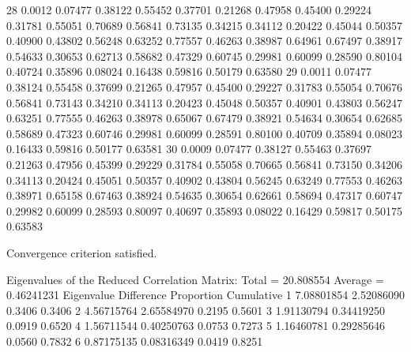 \documentclass{article}
\begin{document}
\begin{Woutput}
   28      0.0012  0.07477  0.38122  0.55452  0.37701  0.21268  0.47958  0.45400  0.29224  0.31781
                   0.55051  0.70689  0.56841  0.73135  0.34215  0.34112  0.20422  0.45044  0.50357
                   0.40900  0.43802  0.56248  0.63252  0.77557  0.46263  0.38987  0.64961  0.67497
                   0.38917  0.54633  0.30653  0.62713  0.58682  0.47329  0.60745  0.29981  0.60099
                   0.28590  0.80104  0.40724  0.35896  0.08024  0.16438  0.59816  0.50179  0.63580
   29      0.0011  0.07477  0.38124  0.55458  0.37699  0.21265  0.47957  0.45400  0.29227  0.31783
                   0.55054  0.70676  0.56841  0.73143  0.34210  0.34113  0.20423  0.45048  0.50357
                   0.40901  0.43803  0.56247  0.63251  0.77555  0.46263  0.38978  0.65067  0.67479
                   0.38921  0.54634  0.30654  0.62685  0.58689  0.47323  0.60746  0.29981  0.60099
                   0.28591  0.80100  0.40709  0.35894  0.08023  0.16433  0.59816  0.50177  0.63581
   30      0.0009  0.07477  0.38127  0.55463  0.37697  0.21263  0.47956  0.45399  0.29229  0.31784
                   0.55058  0.70665  0.56841  0.73150  0.34206  0.34113  0.20424  0.45051  0.50357
                   0.40902  0.43804  0.56245  0.63249  0.77553  0.46263  0.38971  0.65158  0.67463
                   0.38924  0.54635  0.30654  0.62661  0.58694  0.47317  0.60747  0.29982  0.60099
                   0.28593  0.80097  0.40697  0.35893  0.08022  0.16429  0.59817  0.50175  0.63583

Convergence criterion satisfied.

Eigenvalues of the Reduced Correlation Matrix: Total = 20.808554  Average = 0.46241231
        Eigenvalue    Difference    Proportion    Cumulative
   1    7.08801854    2.52086090        0.3406        0.3406
   2    4.56715764    2.65584970        0.2195        0.5601
   3    1.91130794    0.34419250        0.0919        0.6520
   4    1.56711544    0.40250763        0.0753        0.7273
   5    1.16460781    0.29285646        0.0560        0.7832
   6    0.87175135    0.08316349        0.0419        0.8251


\end{Woutput}
\end{document}
